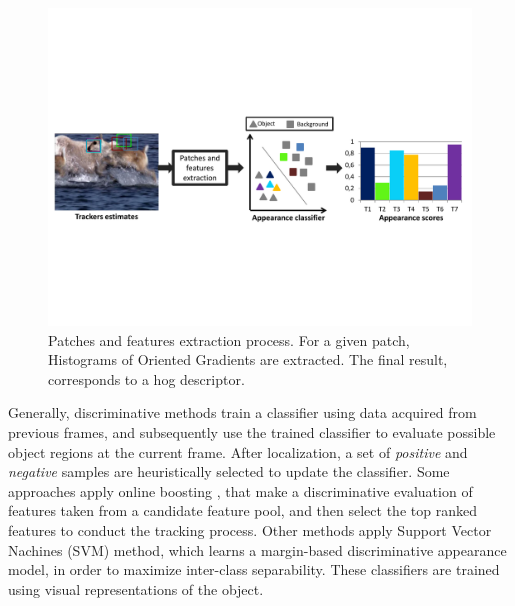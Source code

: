 \begin{figure}[t!]
\centering
\includegraphics[page=2, width=1\linewidth, trim= 0.4cm 8.5cm 4cm 5cm,
                 clip=true]{Figures/figures_mod}
\caption[Patches and features extraction process]
{\small Patches and features extraction process. For a given patch, Histograms
of Oriented Gradients are extracted. The final result, corresponds to a hog
\gls{descriptor}.
}
\label{fig::features_extraction}
\end{figure}

Generally, discriminative methods train a classifier using data acquired from
previous frames, and subsequently use the trained classifier to evaluate
possible object regions at the current frame. After localization, a set of
\textit{positive} and \textit{negative} samples are heuristically selected to
update the classifier. Some approaches apply online boosting
\cite{Babenko2010,Grabner2008,Grabner2006}, that make a discriminative
evaluation of features taken from a candidate feature pool, and then select the
top ranked features to conduct the tracking process. Other methods apply
Support Vector Nachines (SVM) method, which learns a margin-based discriminative
appearance model, in order to maximize inter-class separability. These
classifiers are trained using visual representations of the object.

